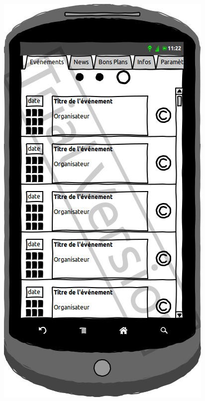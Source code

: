 \documentclass[a4paper, 11px]{article}
\begin{document}
\begin{figure}[htbp]
\begin{minipage}[c]{.50\linewidth}
\begin{center}
			\includegraphics[scale=0.3]{../../Sketch/Android/ListEvent.png}
		\end{center}
	\end{minipage}
\end{figure}
\end{document}

